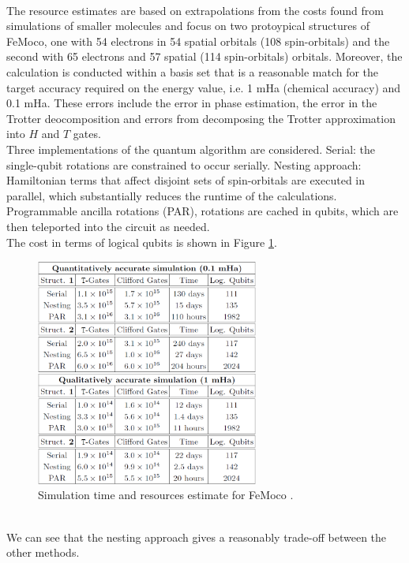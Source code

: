 \\
The resource estimates are based on extrapolations from the costs found from simulations of smaller molecules and focus on two protoypical structures of FeMoco, one with 54 electrons in 54 spatial orbitals (108 spin-orbitals) and the second with 65 electrons and 57 spatial (114 spin-orbitals) orbitals. Moreover, the calculation is conducted within a basis set that is a reasonable match for the target accuracy required on the energy value, i.e. 1 mHa (chemical accuracy) and 0.1 mHa. These errors include the error in phase estimation, the error in the Trotter deocomposition and errors from decomposing the Trotter approximation into $H$ and $T$ gates. \\
Three implementations of the quantum algorithm are considered. Serial: the single-qubit rotations are constrained to occur serially. Nesting approach: Hamiltonian terms that affect disjoint sets of spin-orbitals are executed in parallel, which substantially reduces the runtime of the calculations. Programmable ancilla rotations (PAR), rotations are cached in qubits, which are then teleported into the circuit as needed. \\
The cost in terms of logical qubits is shown in Figure \ref{FeMoco - table 1}.
\begin{figure}[ht]
  \centering
  \includegraphics[width=0.65\textwidth]{figures/FeMoco - table 1.png}
  \caption{Simulation time and resources estimate for FeMoco \cite{Reiher2017Jul}.} \label{FeMoco - table 1}
\end{figure} \\
We can see that the nesting approach gives a reasonably trade-off between the other methods. \\
